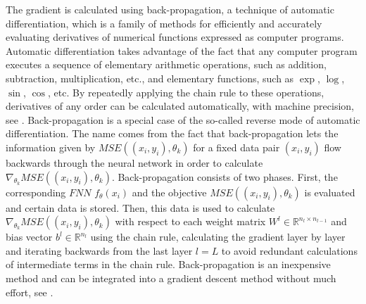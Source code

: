 The gradient is calculated using back-propagation, a technique of automatic differentiation, which is a family of methods for efficiently and accurately evaluating derivatives of numerical functions expressed as computer programs. Automatic differentiation takes advantage of the fact that any computer program executes a sequence of elementary arithmetic operations, such as addition, subtraction, multiplication, etc., and elementary functions, such as $\exp$, $\log$, $\sin$, $\cos$, etc. By repeatedly applying the chain rule to these operations, derivatives of any order can be calculated automatically, with machine precision, see \cite{BaydinPearlmutterAndreyevich:2018}. Back-propagation is a special case of the so-called reverse mode of automatic differentiation. The name comes from the fact that back-propagation lets the information given by $MSE((x_i, y_i), \theta_k)$ for a fixed data pair $(x_i, y_i)$ flow backwards through the neural network in order to calculate $\nabla_{\theta_k} MSE((x_i, y_i), \theta_k)$. Back-propagation consists of two phases. First, the corresponding $FNN$ $f_{\theta} \left(x_{i}\right)$ and the objective $MSE((x_i, y_i), \theta_k)$ is evaluated and certain data is stored. Then, this data is used to calculate $\nabla_{\theta_k} MSE((x_i, y_i), \theta_k)$ with respect to each weight matrix $W^l \in \mathbb{R}^{n_l \times n_{l-1}}$ and bias vector $b^l \in \mathbb{R}^{n_l}$ using the chain rule, calculating the gradient layer by layer and iterating backwards from the last layer $l=L$ to avoid redundant calculations of intermediate terms in the chain rule. Back-propagation is an inexpensive method and can be integrated into a gradient descent method without much effort, see \cite[section~6.5]{GoodfellowBengioCourville:2016}.\\

